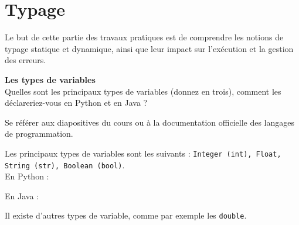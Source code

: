 \section{Typage}

Le but de cette partie des travaux pratiques est de comprendre les notions de typage statique et dynamique, ainsi que leur impact sur l’exécution et la gestion des erreurs. \\

\begin{Exercice}[5 minutes]  \textbf{Les types de variables}\\
    
    Quelles sont les principaux types de variables (donnez en trois), comment les déclareriez-vous en Python et en Java ? \\

    \begin{conseil}
    
        Se référer aux diapositives du cours ou à la documentation officielle des langages de programmation.
        
    \end{conseil}
    \begin{solution}
    
        Les principaux types de variables sont les suivants : \lstinline{Integer (int), Float, String (str), Boolean (bool)}.\\

		En Python :    
        
    	 
    	
    	
    	En Java : 
    	
    	 
    	
    	Il existe d'autres types de variable, comme par exemple les \lstinline{double}.
 
    \end{solution}
\end{Exercice}


